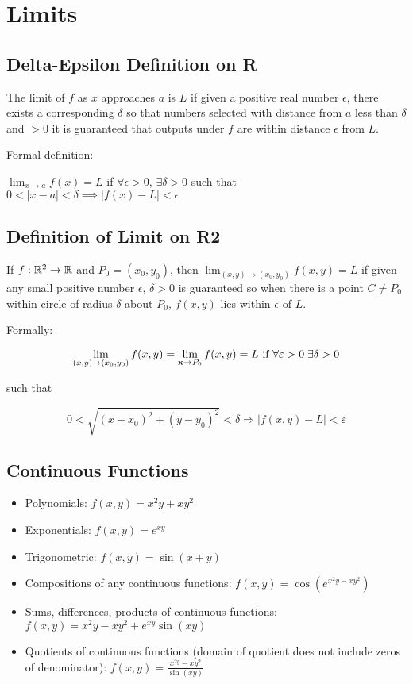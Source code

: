 \section{Limits}

\subsection{Delta-Epsilon Definition on R}

The limit of $f$ as $x$ approaches $a$ is $L$ if given a positive real number
$\epsilon$, there exists a corresponding $\delta$ so that numbers selected with distance from $a$
less than $\delta$ and $>0$ it is guaranteed that outputs under $f$ are within distance $\epsilon$ from $L$.

Formal definition:

$\lim_{x\to a}f(x)=L$ if $\forall \epsilon >0$, $\exists\delta > 0$ such that $0< |x-a| < \delta \implies |f(x)-L|<\epsilon$

\subsection{Definition of Limit on R2}

If $f:\mathbb{R}^2\to \mathbb{R}$ and $P_0=(x_0,y_0)$, then $\lim _{(x, y) \rightarrow\left(x_{0}, y_{0}\right)} f(x, y)=L$ 
if given any small positive number $\epsilon$, $\delta>0$ is guaranteed so when there is a point $C\neq P_0$ within circle of radius $\delta$ about $P_0$, $f(x,y)$ lies within $\epsilon$ of $L$.

Formally: 

\[\lim _{(x, y) \rightarrow\left(x_{0}, y_{0}\right)} f(x, y)=\lim _{\textbf{x} \rightarrow P_{0}} f(x, y)=L \text { if } \forall \varepsilon>0 \;\exists \delta>0\]

such that

\[0<\sqrt{\left(x-x_{0}\right)^{2}+\left(y-y_{0}\right)^{2}}<\delta \Longrightarrow|f(x, y)-L|<\varepsilon\]

\subsection{Continuous Functions}

\begin{itemize}
    \item Polynomials: $f(x,y)=x^2y+xy^2$
    \item Exponentials: $f(x,y)=e^{xy}$
    \item Trigonometric: $f(x,y)=\sin(x+y)$
    \item Compositions of any continuous functions: $f(x,y)=\cos(e^{x^2y-xy^2})$
    \item Sums, differences, products of continuous functions: $f(x, y)=x^{2} y-x y^{2}+e^{x y} \sin (x y)$
    \item Quotients of continuous functions (domain of quotient does not include zeros of denominator): $f(x, y)=\frac{x^{2 y}-x y^{2}}{\sin (x y)}$
\end{itemize}

